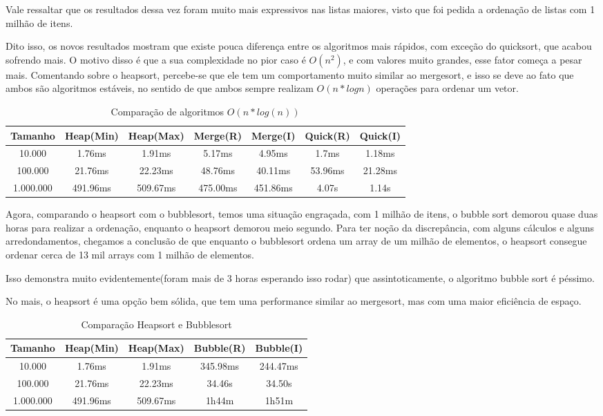 Vale ressaltar que os resultados dessa vez foram muito mais expressivos nas listas
maiores, visto que foi pedida a ordenação de listas com 1 milhão de itens.

Dito isso, os novos resultados mostram que existe pouca diferença entre os algoritmos mais rápidos,
com exceção do quicksort, que acabou sofrendo mais. O motivo disso é que a sua complexidade no
pior caso é $O(n^{2})$, e com valores muito grandes, esse fator começa a pesar mais. Comentando sobre o heapsort, percebe-se
que ele tem um comportamento muito similar ao mergesort, e isso se deve ao fato que ambos são algoritmos estáveis,
no sentido de que ambos sempre realizam $O(n * log n)$ operações para ordenar um vetor.

\begin{table}[ht!]
    \centering
    \begin{tabular}{|c|c|c|c|c|c|c|}
        \hline
        Tamanho & Heap(Min) & Heap(Max) & Merge(R) & Merge(I) & Quick(R) & Quick(I) \\
        \hline
        10.000 & 1.76ms & 1.91ms & 5.17ms & 4.95ms & 1.7ms & 1.18ms \\
        100.000 & 21.76ms & 22.23ms & 48.76ms & 40.11ms & 53.96ms & 21.28ms \\
        1.000.000 & 491.96ms & 509.67ms & 475.00ms & 451.86ms & 4.07s & 1.14s \\
        \hline
    \end{tabular}
    \caption{Comparação de algoritmos $O(n * log(n))$}
\end{table}

Agora, comparando o heapsort com o bubblesort, temos uma situação engraçada, com 1 milhão de itens,
o bubble sort demorou quase duas horas para realizar a ordenação, enquanto o heapsort demorou meio segundo.
Para ter noção da discrepância, com alguns cálculos e alguns arredondamentos, chegamos a conclusão 
de que enquanto o bubblesort ordena um array de um milhão de elementos, o heapsort consegue ordenar cerca de
13 mil arrays com 1 milhão de elementos. 

Isso demonstra muito evidentemente(foram mais de 3 horas esperando isso rodar) que assintoticamente,
o algoritmo bubble sort é péssimo.

No mais, o heapsort é uma opção bem sólida, que tem uma performance similar ao mergesort, mas com uma
maior eficiência de espaço.

\begin{table}[ht!]
    \centering
    \begin{tabular}{|c|c|c|c|c|}
        \hline
        Tamanho & Heap(Min) & Heap(Max) & Bubble(R) & Bubble(I) \\
        \hline
        10.000 & 1.76ms & 1.91ms & 345.98ms & 244.47ms  \\
        100.000 & 21.76ms & 22.23ms & 34.46s & 34.50s  \\
        1.000.000 & 491.96ms & 509.67ms & 1h44m & 1h51m  \\
        \hline
    \end{tabular}
    \caption{Comparação Heapsort e Bubblesort}
\end{table}
